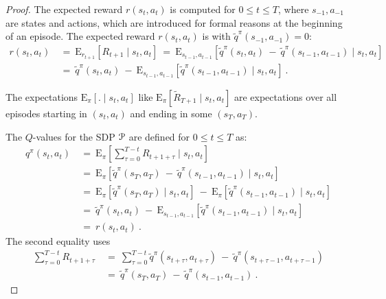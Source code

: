 \documentclass{article}
\newcommand\EXP{\mathbf{\mathrm{E}}}
\renewcommand{\leq}{\leqslant}
\begin{document}
\begin{appendices}
\begin{proof}
The expected reward $r(s_t,a_t)$ is computed for $0\leq t \leq T$, 
where $s_{-1},a_{-1}$ are states and actions, which are introduced 
for formal reasons at the beginning of an episode. 
The expected reward $r(s_t,a_t)$ 
is with $\tilde{q}^\pi(s_{-1},a_{-1})=0$:
\begin{align}
   r(s_t,a_t) \ &= \  \EXP_{r_{t+1}}  \left[R_{t+1} \mid s_t,a_t \right]
   \ = \ \EXP_{s_{t-1},a_{t-1}} \left[ \tilde{q}^\pi(s_t,a_t) \ - \ 
   \tilde{q}^\pi(s_{t-1},a_{t-1}) \mid s_t,a_t \right] \\ \nonumber 
   &= \ \tilde{q}^\pi(s_t,a_t) \ - \ 
   \EXP_{s_{t-1},a_{t-1}} \left[ \tilde{q}^\pi(s_{t-1},a_{t-1}) 
   \mid s_t,a_t \right] \ .
\end{align} 

The expectations
$\EXP_{\pi}\left[.\mid  s_t,a_t\right]$
like
$\EXP_{\pi}\left[\tilde{R}_{T+1}\mid  s_t,a_t\right]$
are expectations over all episodes starting in $(s_t,a_t)$
and ending in some $(s_T,a_T)$.

The $Q$-values for the SDP $\mathcal{P}$
are defined for $0\leq t \leq T$ as:
\begin{align}
    q^\pi(s_t,a_t) \ &= \ 
    \EXP_{\pi}  \left[ \sum_{\tau=0}^{T-t} R_{t+1+\tau} \mid s_t,a_t \right] 
    \\\nonumber &= \ \EXP_{\pi}  \left[ \tilde{q}^\pi(s_T,a_T) \ - \  
    \tilde{q}^\pi(s_{t-1},a_{t-1}) \mid s_t,a_t \right] 
    \\\nonumber &= \ 
    \EXP_{\pi}  \left[ \tilde{q}^\pi(s_T,a_T) \mid s_t,a_t \right]  \ - \  
    \EXP_{\pi}  \left[ \tilde{q}^\pi(s_{t-1},a_{t-1}) \mid s_t,a_t \right] 
    \\\nonumber &= \ 
     \tilde{q}^\pi(s_t,a_t) \ - \  
    \EXP_{s_{t-1},a_{t-1}}  \left[ \tilde{q}^\pi(s_{t-1},a_{t-1}) 
    \mid s_t,a_t \right] 
    \\\nonumber &= \ r(s_t,a_t) \ .
\end{align} 
The second equality uses
\begin{align}
  \sum_{\tau=0}^{T-t} R_{t+1+\tau} \ &= \  \sum_{\tau=0}^{T-t}
  \tilde{q}^\pi(s_{t+\tau},a_{t+\tau}) \ - \    
   \tilde{q}^\pi(s_{t+\tau-1},a_{t+\tau-1}) \\ \nonumber
  &= \ \tilde{q}^\pi(s_T,a_T) \ - \  \tilde{q}^\pi(s_{t-1},a_{t-1}) \ .
\end{align} 


\end{proof}
\end{appendices}
\end{document}
